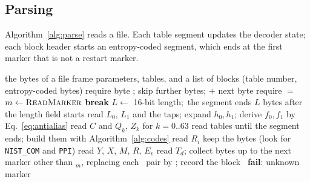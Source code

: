 \subsection{Parsing}

Algorithm~\ref{alg:parse} reads a file. Each table segment updates the decoder state; each block
header starts an entropy-coded segment, which ends at the first marker that is not a restart
marker.

\begin{algorithm}[ht]
  \caption{Reading a WSQ file.}
  \label{alg:parse}
  \begin{algorithmic}[1]
    \Require the bytes of a file
    \Ensure frame parameters, tables, and a list of blocks (table number, entropy-coded bytes)
      \State require byte ; skip further  bytes; \Return {} $+$ next byte
    \EndFunction
    \State require  $=$ 
    \Loop
      \State $m \gets \Call{ReadMarker}{}$
       \textbf{break} \EndIf
      \State $L \gets$ 16-bit length;\ the segment ends $L$ bytes after the length field starts
       read $L_0$, $L_1$ and the taps; expand $h_0, h_1$; derive $f_0, f_1$ by Eq.~\eqref{eq:antialias}
       read $C$ and $Q_k$, $Z_k$ for $k = 0..63$
       read tables until the segment ends; build them with Algorithm~\ref{alg:codes}
       read $R_i$
       keep the bytes (look for \texttt{NIST\_COM} and \texttt{PPI})
       read $Y$, $X$, $M$, $R$, $E_v$
        \State read $T_d$; collect bytes up to the next marker other than $_m$,
               replacing each \, pair by ; record the block
      \Else\ \textbf{fail}: unknown marker
      \EndIf
    \EndLoop
  \end{algorithmic}
\end{algorithm}
